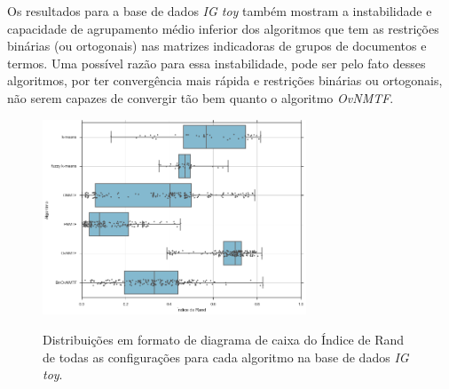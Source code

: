 \documentclass[
    12pt,                %
    oneside,            %
    a4paper,            %
    english,            %
    brazil                %
    ]{abntex2ppgsi}
\begin{document}
Os resultados para a base de dados \textit{IG toy} também mostram a instabilidade e capacidade de agrupamento médio inferior dos algoritmos que tem as restrições binárias (ou ortogonais) nas matrizes indicadoras de grupos de documentos e termos.
Uma possível razão para essa instabilidade, pode ser pelo fato desses algoritmos, por ter convergência mais rápida e restrições binárias ou ortogonais, não serem capazes de convergir tão bem quanto o algoritmo \textit{OvNMTF}.

\begin{figure}[H]
    \centering
    \caption{Distribuições em formato de diagrama de caixa do Índice de Rand de todas as configurações para cada algoritmo na base de dados \textit{IG toy}.}
    \includegraphics[width=0.7\textwidth]{img/boxplot-all-rand-igtoy.png}
    \label{fig:boxplot-all-rand:igtoy}
\end{figure}
\end{document}
